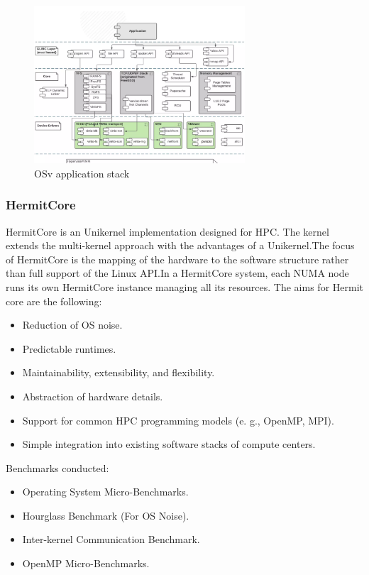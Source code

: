 \begin{figure}[htbp!] 
  \centering    
  \includegraphics[width=0.7\textwidth]{OSvStack}
  \caption[OSv]{OSv application stack}
  \label{fig:OSv}
  \end{figure}



\subsubsection{HermitCore}
HermitCore is an Unikernel implementation designed for HPC. The kernel extends the
multi-kernel approach with the advantages of a Unikernel.The focus of HermitCore is 
the mapping of the hardware to
the software structure rather than full support of the Linux
API.In a HermitCore system, each NUMA node runs its own HermitCore instance managing all its resources.
The aims for Hermit core are the following:
\begin{itemize}
  \item Reduction of OS noise.
  \item Predictable runtimes.
  \item Maintainability, extensibility, and flexibility.
  \item Abstraction of hardware details.
  \item Support for common HPC programming models (e. g.,
  OpenMP, MPI).
  \item Simple integration into existing software stacks of
  compute centers.
\end{itemize}
Benchmarks conducted:
\begin{itemize}
  \item Operating System Micro-Benchmarks.
  \item Hourglass Benchmark (For OS Noise).
  \item Inter-kernel Communication Benchmark.
  \item OpenMP Micro-Benchmarks.
\end{itemize}

